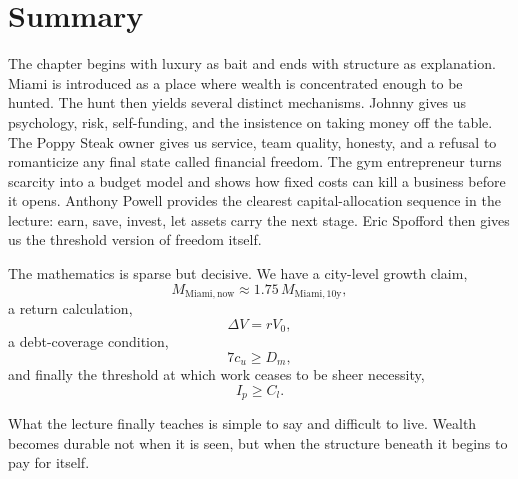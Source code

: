 \section{Summary}

The chapter begins with luxury as bait and ends with structure as explanation. Miami is introduced as a place where wealth is concentrated enough to be hunted. The hunt then yields several distinct mechanisms. Johnny gives us psychology, risk, self-funding, and the insistence on taking money off the table. The Poppy Steak owner gives us service, team quality, honesty, and a refusal to romanticize any final state called financial freedom. The gym entrepreneur turns scarcity into a budget model and shows how fixed costs can kill a business before it opens. Anthony Powell provides the clearest capital-allocation sequence in the lecture: earn, save, invest, let assets carry the next stage. Eric Spofford then gives us the threshold version of freedom itself.

The mathematics is sparse but decisive. We have a city-level growth claim,
\[
M_{\mathrm{Miami,now}} \approx 1.75\,M_{\mathrm{Miami,10y}},
\]
a return calculation,
\[
\Delta V = rV_0,
\]
a debt-coverage condition,
\[
7c_u \ge D_m,
\]
and finally the threshold at which work ceases to be sheer necessity,
\[
I_p \ge C_l.
\]

What the lecture finally teaches is simple to say and difficult to live. Wealth becomes durable not when it is seen, but when the structure beneath it begins to pay for itself.